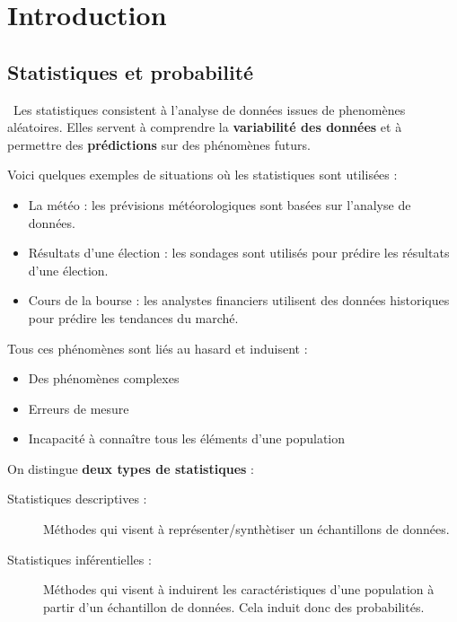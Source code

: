 \chapter{Introduction}

\section{Statistiques et probabilité}
\
Les statistiques consistent à l'analyse de données issues de phenomènes aléatoires. 
Elles servent à comprendre la \textbf{variabilité des données} et à permettre des \textbf{prédictions} sur des phénomènes futurs.

\begin{exemple}
    Voici quelques exemples de situations où les statistiques sont utilisées :
    \begin{itemize}
        \item La météo : les prévisions météorologiques sont basées sur l'analyse de données.
        \item Résultats d'une élection : les sondages sont utilisés pour prédire les résultats d'une élection.
        \item Cours de la bourse : les analystes financiers utilisent des données historiques pour prédire les tendances du marché.
    \end{itemize}
\end{exemple}

Tous ces phénomènes sont liés au hasard et induisent :
\begin{itemize}
    \item Des phénomènes complexes
    \item Erreurs de mesure
    \item Incapacité à connaître tous les éléments d'une population
\end{itemize}

On distingue \textbf{deux types de statistiques} :
\begin{description}
    \item[Statistiques descriptives : ] Méthodes qui visent à représenter/synthètiser un échantillons de données.
    \item[Statistiques inférentielles : ] Méthodes qui visent à induirent les caractéristiques d'une population à partir d'un échantillon de données. Cela induit donc des probabilités.
    \item[] 
\end{description}
